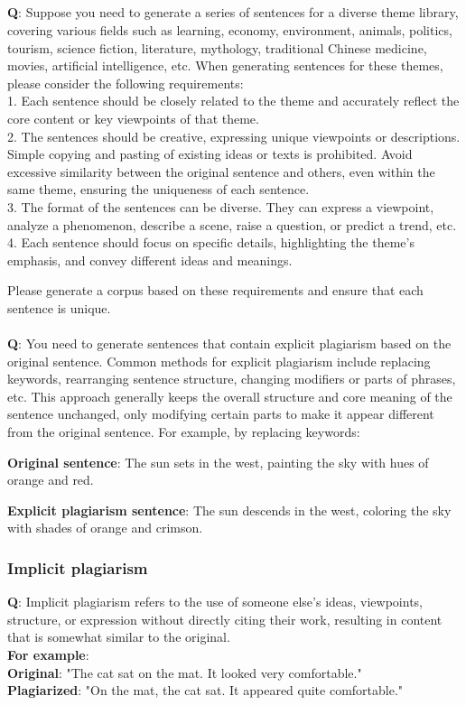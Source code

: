 \\\\\\\\

\textbf{Q}: Suppose you need to generate a series of sentences for a diverse theme library, covering various fields such as learning, economy, environment, animals, politics, tourism, science fiction, literature, mythology, traditional Chinese medicine, movies, artificial intelligence, etc. When generating sentences for these themes, please consider the following requirements:  \\
1. Each sentence should be closely related to the theme and accurately reflect the core content or key viewpoints of that theme.  \\
2. The sentences should be creative, expressing unique viewpoints or descriptions. Simple copying and pasting of existing ideas or texts is prohibited. Avoid excessive similarity between the original sentence and others, even within the same theme, ensuring the uniqueness of each sentence.  \\
3. The format of the sentences can be diverse. They can express a viewpoint, analyze a phenomenon, describe a scene, raise a question, or predict a trend, etc.  \\
4. Each sentence should focus on specific details, highlighting the theme's emphasis, and convey different ideas and meanings.  

Please generate a corpus based on these requirements and ensure that each sentence is unique.\\

\\
\textbf{Q}: You need to generate sentences that contain explicit plagiarism based on the original sentence. Common methods for explicit plagiarism include replacing keywords, rearranging sentence structure, changing modifiers or parts of phrases, etc. This approach generally keeps the overall structure and core meaning of the sentence unchanged, only modifying certain parts to make it appear different from the original sentence. For example, by replacing keywords:

\textbf{Original sentence}:  
The sun sets in the west, painting the sky with hues of orange and red.  

\textbf{Explicit plagiarism sentence}:  
The sun descends in the west, coloring the sky with shades of orange and crimson.

\subsubsection{Implicit plagiarism}
\textbf{Q}: Implicit plagiarism refers to the use of someone else's ideas, viewpoints, structure, or expression without directly citing their work, resulting in content that is somewhat similar to the original.\\
\textbf{For example}:  \\
\textbf{Original}: "The cat sat on the mat. It looked very comfortable." \\
\textbf{Plagiarized}: "On the mat, the cat sat. It appeared quite comfortable."

